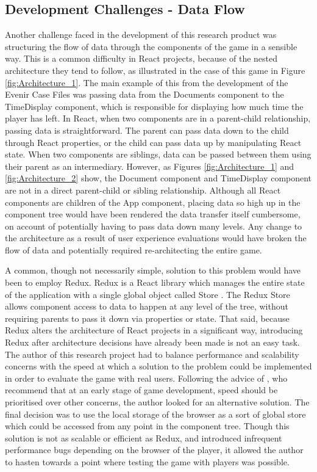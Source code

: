 \documentclass{l4proj}
\begin{document}
\subsection{Development Challenges - Data Flow}

Another challenge faced in the development of this research product was structuring the flow of data through the components of the game in a sensible way. This is a common difficulty in React projects, because of the nested architecture they tend to follow, as illustrated in the case of this game in Figure \ref{fig:Architecture_1}. The main example of this from the development of the Evenir Case Files was passing data from the Documents component to the TimeDisplay component, which is responsible for displaying how much time the player has left. In React, when two components are in a parent-child relationship, passing data is straightforward. The parent can pass data down to the child through React properties, or the child can pass data up by manipulating React state. When two components are siblings, data can be passed between them using their parent as an intermediary. However, as Figures \ref{fig:Architecture_1} and \ref{fig:Architecture_2} show, the Document component and TimeDisplay component are not in a direct parent-child or sibling relationship. Although all React components are children of the App component, placing data so high up in the component tree would have been rendered the data transfer itself cumbersome, on account of potentially having to pass data down many levels. Any change to the architecture as a result of user experience evaluations would have broken the flow of data and potentially required re-architecting the entire game. 

A common, though not necessarily simple, solution to this problem would have been to employ Redux. Redux is a React library which manages the entire state of the application with a single global object called Store \citep{redux}. The Redux Store allows component access to data to happen at any level of the tree, without requiring parents to pass it down via properties or state. That said, because Redux alters the architecture of React projects in a significant way, introducing Redux after architecture decisions have already been made is not an easy task. The author of this research project had to balance performance and scalability concerns with the speed at which a solution to the problem could be implemented in order to evaluate the game with real users. Following the advice of \citet{salen2004rules}, who recommend that at an early stage of game development, speed should be prioritised over other concerns, the author looked for an alternative solution. The final decision was to use the local storage of the browser as a sort of global store which could be accessed from any point in the component tree. Though this solution is not as scalable or efficient as Redux, and introduced infrequent performance bugs depending on the browser of the player, it allowed the author to hasten towards a point where testing the game with players was possible.  
\end{document}
